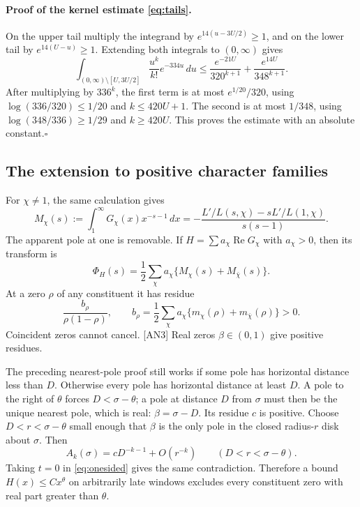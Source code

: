 \documentclass[11pt,a4paper]{article}
\numberwithin{equation}{section}
\theoremstyle{remark}\newtheorem{remark}[theorem]{Remark}
\newcommand{\Rea}{\operatorname{Re}}
\begin{document}
\paragraph{Proof of the kernel estimate \eqref{eq:tails}.}
On the upper tail multiply the integrand by $e^{14(u-3U/2)}\ge1$, and on the lower tail by $e^{14(U-u)}\ge1$. Extending both integrals to $(0,\infty)$ gives
\[
\int_{(0,\infty)\setminus[U,3U/2]}
\frac{u^k}{k!}e^{-334u}\,du
\le\frac{e^{-21U}}{320^{k+1}}+\frac{e^{14U}}{348^{k+1}}.
\]
After multiplying by $336^k$, the first term is at most $e^{1/20}/320$, using $\log(336/320)\le1/20$ and $k\le420U+1$. The second is at most $1/348$, using $\log(348/336)\ge1/29$ and $k\ge420U$. This proves the estimate with an absolute constant.\hfill$\square$

\subsection{The extension to positive character families}

For $\chi\ne1$, the same calculation gives
\begin{equation}\label{eq:Mchi}
M_\chi(s):=\int_1^\infty G_\chi(x)x^{-s-1}\,dx
=-\frac{L'/L(s,\chi)-sL'/L(1,\chi)}{s(s-1)}.
\end{equation}
The apparent pole at one is removable. If $H=\sum a_\chi\Rea G_\chi$ with $a_\chi>0$, then its transform is
\[
\Phi_H(s)=\frac12\sum_\chi a_\chi\{M_\chi(s)+M_{\bar\chi}(s)\}.
\]
At a zero $\rho$ of any constituent it has residue
\begin{equation}\label{eq:weightedres}
\frac{b_\rho}{\rho(1-\rho)},\qquad
b_\rho=\frac12\sum_\chi a_\chi
             \{m_\chi(\rho)+m_{\bar\chi}(\rho)\}>0.
\end{equation}
Coincident zeros cannot cancel. \textsf{[AN3]} Real zeros $\beta\in(0,1)$ give positive residues.\cite{poles}

The preceding nearest-pole proof still works if some pole has horizontal distance less than $D$. Otherwise every pole has horizontal distance at least $D$. A pole to the right of $\theta$ forces $D<\sigma-\theta$; a pole at distance $D$ from $\sigma$ must then be the unique nearest pole, which is real: $\beta=\sigma-D$. Its residue $c$ is positive. Choose $D<r<\sigma-\theta$ small enough that $\beta$ is the only pole in the closed radius-$r$ disk about $\sigma$. Then
\[
A_k(\sigma)=cD^{-k-1}+O(r^{-k})\qquad(D<r<\sigma-\theta).
\]
Taking $t=0$ in \eqref{eq:onesided} gives the same contradiction. Therefore a bound $H(x)\le Cx^\theta$ on arbitrarily late windows excludes every constituent zero with real part greater than $\theta$.
\end{document}
